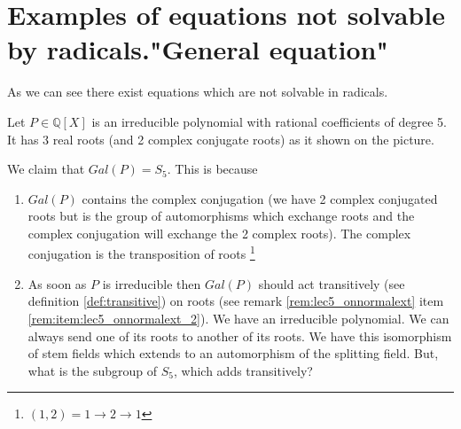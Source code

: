 \section{Examples of equations not solvable by radicals."General
  equation"}
As we can see there exist equations which are not solvable in
radicals.

\begin{example}
  Let $P \in \mathbb{Q}\left[X\right]$ is an irreducible polynomial
  with rational 
  coefficients of degree 5. It has 3 real roots (and 2 complex
  conjugate roots) as it shown on the picture.
  

  We claim that $Gal\left(P\right) = S_5$. This is because
  \begin{enumerate}
    \item $Gal\left(P\right)$ contains the complex conjugation (we
      have 2 complex conjugated roots but  is
      the group of automorphisms which exchange roots and the complex
      conjugation will exchange the 2 complex roots).
      The complex conjugation is the transposition of roots
      \footnote{
        $(1,2) = 1 \to 2 \to 1$
      }
    \item As soon as $P$ is irreducible then $Gal\left(P\right)$
      should act transitively (see definition \ref{def:transitive})
      on      
      roots (see remark
      \ref{rem:lec5_onnormalext} item
      \ref{rem:item:lec5_onnormalext_2}). We have an irreducible  
      polynomial. We can always send 
      one of its roots to another of its roots. We have this
      isomorphism of stem fields which extends to an automorphism of
      the splitting field. But, what is the subgroup of $S_5$, which adds
      transitively?


\end{enumerate}
\end{example}
